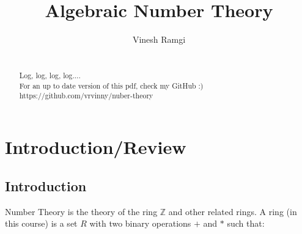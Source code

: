 \documentclass[11pt]{article}
\begin{document}
\newtheorem{theorem}{Theorem}[section]
\newtheorem{definition}[theorem]{Defintion}
\newtheorem{proposition}[theorem]{Proposition}
\newtheorem{corollary}[theorem]{Corollary}
\newtheorem{lemma}[theorem]{Lemma}

\title{Algebraic Number Theory}
\author{Vinesh Ramgi}
	\maketitle


\newpage
	\begin{abstract}

		\\[1em]
		Log, log, log, log....\\[2em]

		For an up to date version of this pdf, check my GitHub :)\\[0.5em]
https://github.com/vrvinny/nuber-theory

	\end{abstract}
\newpage
\tableofcontents{}
\newpage
	\section{Introduction/Review}
	\subsection{Introduction}
	Number Theory is the theory of the ring $\mathbb{Z}$ and other related rings. A ring (in this course) is a set $R$ with two binary operations $+$ and $*$ such that:
\end{document}

